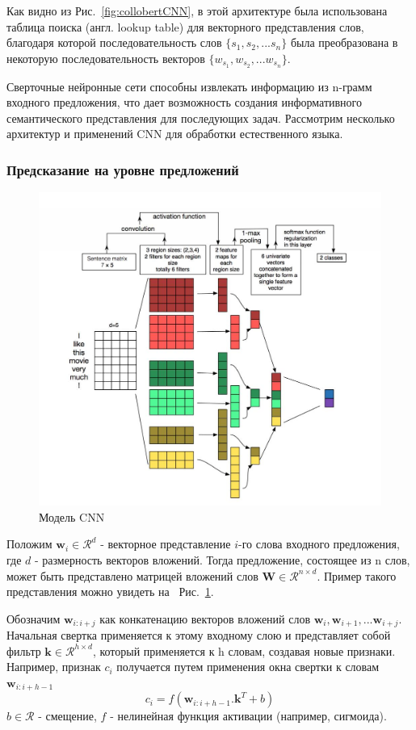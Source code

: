Как видно из Рис.~\ref{fig:collobertCNN}, в этой архитектуре была использована таблица поиска (англ. lookup table) для векторного представления слов, благодаря которой последовательность слов $\{s_1, s_2, ... s_n\}$ была преобразована в некоторую последовательность векторов $\{ {{w}_{s_1}}, {{w}_{s_2}}, ... {{w}_{s_n}} \}$.

Сверточные нейронные сети способны извлекать информацию из n-грамм входного предложения, что дает возможность создания информативного семантического представления для последующих задач. Рассмотрим несколько архитектур и применений CNN для обработки естественного языка.

\subsubsection{Предсказание на уровне предложений}
\begin{figure}[t]
	\includegraphics[scale=0.45]{img/CNN}
	\centering
	\caption{Модель CNN}\label{fig:CNN}
\end{figure}
Положим ${\mathbf w_{i}} \in \mathcal{R}^d$ - векторное представление $i$-го слова входного предложения, где $d$ - размерность векторов вложений. Тогда предложение, состоящее из n слов, может быть представлено матрицей вложений слов ${\mathbf W} \in \mathcal{R}^{n \times d}$. Пример такого представления можно увидеть на ~Рис.~\ref{fig:CNN}.

Обозначим ${\mathbf w_{i:i+j}} $ как конкатенацию векторов
 вложений слов ${\mathbf w_{i}}, {\mathbf w_{i+1}}, ... {\mathbf w_{i+j}}$. Начальная свертка применяется к этому входному слою и представляет собой фильтр ${\mathbf k} \in \mathcal{R}^{h \times d}$, который применяется к h словам, создавая новые признаки. Например, признак $c_i$ получается путем применения окна свертки к словам ${\mathbf w_{i:i+h-1}} $
\begin{equation}
c_i = f({\mathbf w_{i:i+h-1}}.{\mathbf k}^T + b )
\end{equation} 
 $b \in \mathcal{R}$ - смещение, $f$ - нелинейная функция активации (например, сигмоида). 
 
